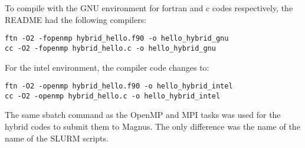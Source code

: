 To compile with the GNU environment for fortran and c codes respectively, the README had the following compilers:

\begin{tcolorbox}
\begin{Verbatim}[fontsize=\scriptsize]
ftn -O2 -fopenmp hybrid_hello.f90 -o hello_hybrid_gnu
cc -O2 -fopenmp hybrid_hello.c -o hello_hybrid_gnu
\end{Verbatim}
\end{tcolorbox}

For the intel environment, the compiler code changes to:

\begin{tcolorbox}
\begin{Verbatim}[fontsize=\scriptsize]
ftn -O2 -openmp hybrid_hello.f90 -o hello_hybrid_intel
cc -O2 -openmp hybrid_hello.c -o hello_hybrid_intel
\end{Verbatim}
\end{tcolorbox}

The same sbatch command as the OpenMP and MPI tasks was used for the hybrid codes to submit them to Magnus. The only difference was the name of the name
of the SLURM scripts.

